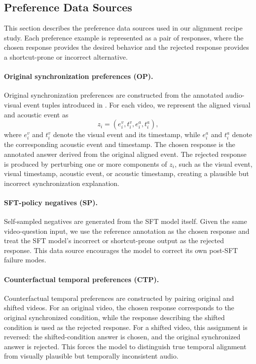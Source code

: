 \subsection{Preference Data Sources}
\label{app:recipe-data}

This section describes the preference data sources used in our alignment recipe study. Each preference example is represented as a pair of responses, where the chosen response provides the desired behavior and the rejected response provides a shortcut-prone or incorrect alternative.

\paragraph{Original synchronization preferences (OP).}
Original synchronization preferences are constructed from the annotated audio-visual event tuples introduced in . For each video, we represent the aligned visual and acoustic event as
\begin{equation}
    z_i = (e_i^v, t_i^v, e_i^a, t_i^a),
\end{equation}
where $e_i^v$ and $t_i^v$ denote the visual event and its timestamp, while $e_i^a$ and $t_i^a$ denote the corresponding acoustic event and timestamp. The chosen response is the annotated answer derived from the original aligned event. The rejected response is produced by perturbing one or more components of $z_i$, such as the visual event, visual timestamp, acoustic event, or acoustic timestamp, creating a plausible but incorrect synchronization explanation.

\paragraph{SFT-policy negatives (SP).}
Self-sampled negatives are generated from the SFT model itself. Given the same video-question input, we use the reference annotation as the chosen response and treat the SFT model's incorrect or shortcut-prone output as the rejected response. This data source encourages the model to correct its own post-SFT failure modes.

\paragraph{Counterfactual temporal preferences (CTP).}
Counterfactual temporal preferences are constructed by pairing original and shifted videos. For an original video, the chosen response corresponds to the original synchronized condition, while the response describing the shifted condition is used as the rejected response. For a shifted video, this assignment is reversed: the shifted-condition answer is chosen, and the original synchronized answer is rejected. This forces the model to distinguish true temporal alignment from visually plausible but temporally inconsistent audio.

